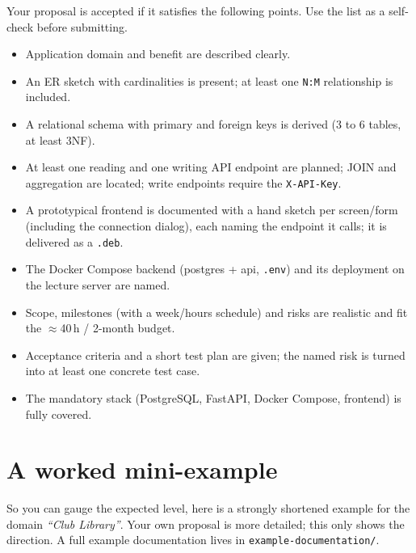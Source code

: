 \documentclass[11pt,a4paper]{article}
\begin{document}
Your proposal is accepted if it satisfies the following points. Use the list as
a self-check before submitting.

\begin{itemize}[leftmargin=1.8em, label=$\square$]
  \item Application domain and benefit are described clearly.
  \item An ER sketch with cardinalities is present; at least one \texttt{N:M}
        relationship is included.
  \item A relational schema with primary and foreign keys is derived
        (3 to 6 tables, at least 3NF).
  \item At least one reading and one writing API endpoint are planned; JOIN and
        aggregation are located; write endpoints require the \texttt{X-API-Key}.
  \item A prototypical frontend is documented with a hand sketch per screen/form
        (including the connection dialog), each naming the endpoint it calls; it
        is delivered as a \texttt{.deb}.
  \item The Docker Compose backend (postgres + api, \texttt{.env}) and its
        deployment on the lecture server are named.
  \item Scope, milestones (with a week/hours schedule) and risks are realistic
        and fit the $\approx$40\,h / 2-month budget.
  \item Acceptance criteria and a short test plan are given; the named risk is
        turned into at least one concrete test case.
  \item The mandatory stack (PostgreSQL, FastAPI, Docker Compose, frontend) is
        fully covered.
\end{itemize}

\section{A worked mini-example}

So you can gauge the expected level, here is a strongly shortened example for
the domain \emph{``Club Library''}. Your own proposal is more detailed; this
only shows the direction. A full example documentation lives in
\texttt{example-documentation/}.
\end{document}
